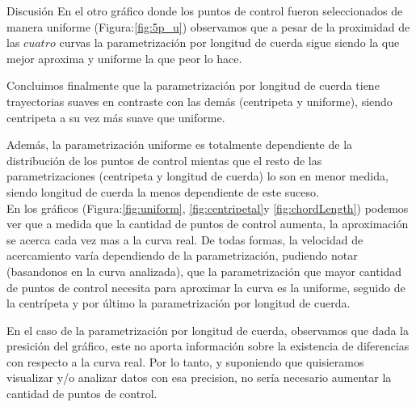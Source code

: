 \begin{section}{Discusión}
	En el otro gráfico donde los puntos de control fueron seleccionados de manera uniforme (Figura:\ref{fig:5p_u}) observamos que a pesar de la proximidad de las $cuatro$ curvas la parametrización por longitud de cuerda sigue siendo la que mejor aproxima y uniforme la que peor lo hace.
	
	Concluimos finalmente que la parametrización por longitud de cuerda tiene trayectorias suaves en contraste con las demás (centripeta y uniforme), siendo centripeta a su vez más suave que uniforme. 
	
	Además, la parametrización uniforme es totalmente dependiente de la distribución de los puntos de control mientas que el resto de las parametrizaciones (centripeta y longitud de cuerda) lo son en menor medida, siendo longitud de cuerda la menos dependiente de este suceso.\\
	
	En los gráficos (Figura:\ref{fig:uniform}, \ref{fig:centripetal}y \ref{fig:chordLength}) podemos ver que a medida que la cantidad de puntos de control aumenta, la aproximación se acerca cada vez mas a la curva real. De todas formas, la velocidad de acercamiento varía dependiendo de la parametrización, pudiendo notar (basandonos en la curva analizada), que la parametrización que mayor cantidad de puntos de control necesita para aproximar la curva es la uniforme, seguido de la centrípeta y por último la parametrización por longitud de cuerda.
	
	En el caso de la parametrización por longitud de cuerda, observamos que dada la presición del gráfico, este no aporta información sobre la existencia de diferencias con respecto a la curva real. Por lo tanto, y suponiendo que quisieramos visualizar y/o analizar datos con esa precision, no sería necesario aumentar la cantidad de puntos de control.
	
	
	


	
\end{section}
